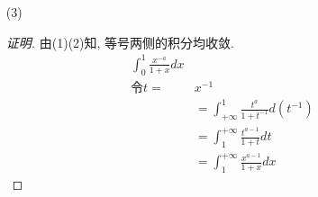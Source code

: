 \documentclass{article}
\begin{document}
\begin{enumerate}
\begin{enumerate}
\begin{proof}[解]
\begin{equation}
                \begin{aligned}
                    \int_{0}^{1}\frac{x^{a-1}}{1+x}dx
                    &=\ln(1+x)\left|_{x=0}^{1}\right. \\
                    &=+\infty
                \end{aligned}
                \nonumber
            \end{equation}
            此时发散; \par
            $a<0$ 时: 取 $1<p<1-a$
            \begin{equation}
                \begin{aligned}
                    \lim_{x\rightarrow0^+}\frac{\frac{x^{a-1}}{1+x}}{\frac{1}{x^p}}
                    &=\lim_{x\rightarrow0^+}x^{a+p-1} \\
                    &=+\infty
                \end{aligned}
                \nonumber
            \end{equation}
            此时发散; \par
            $a>0$ 且 $a\neq1$ 时: 取 $1-a<p<1$
            \begin{equation}
                \begin{aligned}
                    \lim_{x\rightarrow0^+}\frac{\frac{x^{a-1}}{1+x}}{\frac{1}{x^p}}
                    &=\lim_{x\rightarrow0^+}x^{a+p-1} \\
                    &=0
                \end{aligned}
                \nonumber
            \end{equation}
            此时收敛. \par
        \end{proof}
        \item[(3)] \begin{proof}[证明]
            由(1)(2)知, 等号两侧的积分均收敛.
            \begin{equation}
                \begin{aligned}
                    \int_{0}^{1}\frac{x^{-a}}{1+x}dx \\
                    \text{令} t=&x^{-1} \\
                    &=\int_{+\infty}^{1}\frac{t^a}{1+t^{-1}}d(t^{-1}) \\
                    &=\int_{1}^{+\infty}\frac{t^{a-1}}{1+t}dt \\
                    &=\int_{1}^{+\infty}\frac{x^{a-1}}{1+x}dx
                \end{aligned}

\end{equation}
\end{proof}
\end{enumerate}
\end{enumerate}
\end{document}
